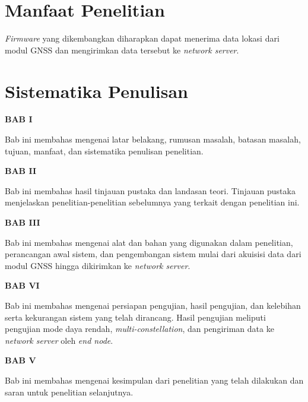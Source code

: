 \section{Manfaat Penelitian}
\textit{Firmware} yang dikembangkan diharapkan dapat menerima data lokasi dari modul GNSS dan mengirimkan data tersebut ke \textit{network server}.

\section{Sistematika Penulisan}
\textbf{BAB I}

Bab ini membahas mengenai latar belakang, rumusan masalah, batasan masalah, tujuan, manfaat, dan sistematika penulisan penelitian.

\textbf{BAB II}

Bab ini membahas hasil tinjauan pustaka dan landasan teori. Tinjauan pustaka menjelaskan penelitian-penelitian sebelumnya yang terkait dengan penelitian ini.

\textbf{BAB III}

Bab ini membahas mengenai alat dan bahan yang digunakan dalam penelitian, perancangan awal sistem, dan pengembangan sistem mulai dari akuisisi data dari modul GNSS hingga dikirimkan ke \textit{network server}.

\textbf{BAB VI}

Bab ini membahas mengenai persiapan pengujian, hasil pengujian, dan kelebihan serta kekurangan sistem yang telah dirancang. Hasil pengujian meliputi pengujian mode daya rendah, \textit{multi-constellation}, dan pengiriman data ke \textit{network server} oleh \textit{end node}.

\textbf{BAB V}

Bab ini membahas mengenai kesimpulan dari penelitian yang telah dilakukan dan saran untuk penelitian selanjutnya.